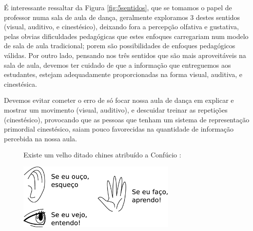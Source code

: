 É interessante ressaltar da Figura \ref{fig:5sentidos}, 
que se tomamos o papel de professor  numa sala de aula de dança, 
geralmente exploramos 3 destes sentidos
(visual, auditivo, e cinestésico), 
deixando fora a percepção olfativa e gustativa, 
pelas obvias dificuldades pedagógicas que estes enfoques carregariam num modelo de sala de aula tradicional;
porem são possibilidades de enfoques pedagógicos válidas.
Por outro lado, pensando nos três sentidos que são mais aproveitáveis na sala de aula,
devemos ter cuidado de que a informação que entreguemos aos estudantes, 
estejam adequadamente proporcionadas na forma visual, auditiva, e cinestésica.
\begin{tcbattention}
Devemos evitar cometer o erro de só focar nossa aula de dança em explicar e mostrar um movimento (visual, auditivo),
e descuidar treinar as repetições (cinestésico), 
provocando que as pessoas que tenham um sistema de representação primordial cinestésico, 
saiam pouco favorecidas na quantidade de informação percebida na nossa aula.
\end{tcbattention}


\begin{figure}[!ht]
\begin{elaboracion}[title=Ditado chines, width= 1.00\linewidth]
Existe um velho ditado chines atribuído a Confúcio \cite[pp. 60, 63]{AprendendoInteligencia2008} \cite[pp. 9]{abe2002introducao}:

\begin{center}
    \includegraphics[width=0.7\textwidth]{chapters/cap-learning/ditadochines.eps}
\end{center}
\end{elaboracion}
\end{figure}

